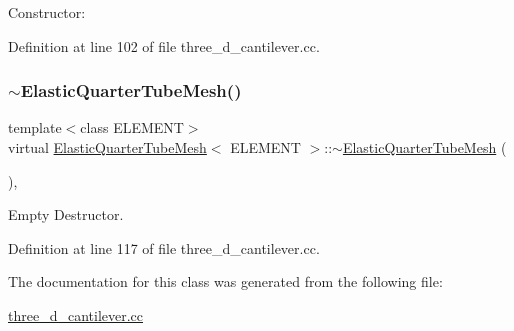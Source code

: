 Constructor\+: 



Definition at line 102 of file three\+\_\+d\+\_\+cantilever.\+cc.

\mbox{\label{classElasticQuarterTubeMesh_a9ad9db1a8cb86650b505c73fe81eb73c}} 
\subsubsection{\texorpdfstring{$\sim$\+Elastic\+Quarter\+Tube\+Mesh()}{~ElasticQuarterTubeMesh()}}
{\footnotesize\ttfamily template$<$class E\+L\+E\+M\+E\+NT$>$ \\
virtual \hyperlink{classElasticQuarterTubeMesh}{Elastic\+Quarter\+Tube\+Mesh}$<$ E\+L\+E\+M\+E\+NT $>$\+::$\sim$\hyperlink{classElasticQuarterTubeMesh}{Elastic\+Quarter\+Tube\+Mesh} (\begin{DoxyParamCaption}{ }\end{DoxyParamCaption})\hspace{0.3cm}{\ttfamily [inline]}, {\ttfamily [virtual]}}



Empty Destructor. 



Definition at line 117 of file three\+\_\+d\+\_\+cantilever.\+cc.



The documentation for this class was generated from the following file\+:\begin{DoxyCompactItemize}
\item 
\hyperlink{three__d__cantilever_8cc}{three\+\_\+d\+\_\+cantilever.\+cc}\end{DoxyCompactItemize}
